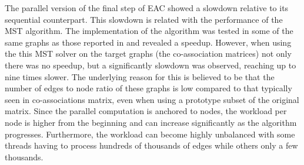 \documentclass[10pt,a4paper,twoside]{report}
\begin{document}
The parallel version of the final step of EAC showed a slowdown relative to its sequential counterpart.
This slowdown is related with the performance of the MST algorithm.
The implementation of the algorithm was tested in some of the same graphs as those reported in \cite{Sousa2015} and revealed a speedup.
However, when using the this MST solver on the target graphs (the co-association matrices) not only there was no speedup, but a significantly slowdown was observed, reaching up to nine times slower.
The underlying reason for this is believed to be that the number of edges to node ratio of these graphs is low compared to that typically seen in co-associations matrix, even when using a prototype subset of the original matrix.
Since the parallel computation is anchored to nodes, the workload per node is higher from the beginning and can increase significantly as the algorithm progresses.
Furthermore, the workload can become highly unbalanced with some threads having to process hundreds of thousands of edges while others only a few thousands.





%
%
%
%
%
%
%
%

%


\cleardoublepage
\cleardoublepage

\appendix

\end{document}
